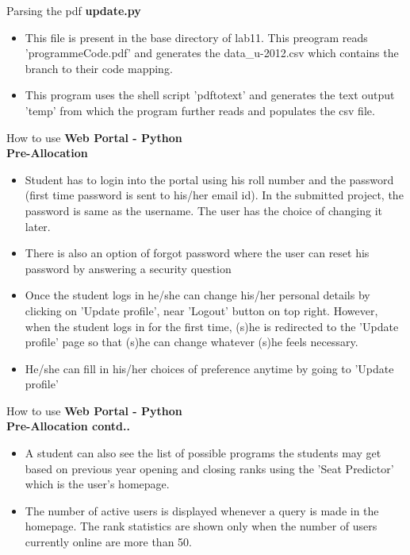 \documentclass{beamer}
\begin{document}
\begin{frame}[t]{Parsing the pdf}
\textbf{update.py}\\
\begin{itemize}[<+->]
\item This file is present in the base directory of lab11. This preogram reads 'programmeCode.pdf' and generates the data\_u-2012.csv which contains the branch to their code mapping.
\item This program uses the shell script 'pdftotext' and generates the text output 'temp' from which the program further reads and populates the csv file.
\end{itemize}
\end{frame}

\begin{frame}[t]{How to use}
\textbf{Web Portal - Python}\\
\pause
\textbf{Pre-Allocation}\\
\begin{itemize}[<+->]
\item Student has to login into the portal using his roll number and the password (first time password is sent to his/her email id). In the submitted project, the password is same as the username. The user has the choice of changing it later.
\item There is also an option of forgot password where the user can reset his password by answering a security question
\item Once the student logs in he/she can change his/her personal details by clicking on 'Update profile', near 'Logout' button on top right. However, when the student logs in for the first time, (s)he is redirected to the 'Update profile' page so that (s)he can change whatever (s)he feels necessary.
\item He/she can fill in his/her choices of preference anytime by going to 'Update profile'
\end{itemize}
\end{frame}

\begin{frame}[t]{How to use}
\textbf{Web Portal - Python}\\
\pause
\textbf{Pre-Allocation contd..}\\
\begin{itemize}[<+->]
\item A student can also see the list of possible programs the students may get based on previous year opening and closing ranks using the 'Seat Predictor' which is the user's homepage.
\item The number of active users is displayed whenever a query is made in the homepage. The rank statistics are shown only when the number of users currently online are more than 50.
\end{itemize}
\end{frame}
\end{document}
